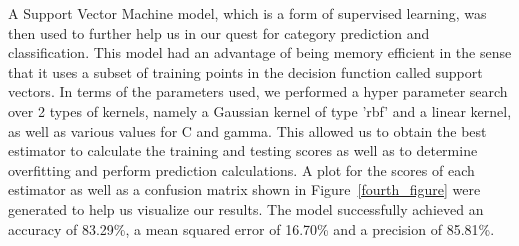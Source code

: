 \documentclass[10pt,twocolumn,letterpaper]{article}
\begin{document}
\begin{figure}[h]
\begin{center}
   \end{center}
        \vspace*{-5mm}
        \caption{\label{third_figure}}
\end{figure}

A Support Vector Machine model, which is a form of supervised learning, was then used to further help us in our quest for category prediction and classification. This model had an advantage of being memory efficient in the sense that it uses a subset of training points in the decision function called support vectors. In terms of the parameters used, we performed a hyper parameter search over 2 types of kernels, namely a Gaussian kernel of type 'rbf' and a linear kernel, as well as various values for C and gamma. This allowed us to obtain the best estimator to calculate the training and testing scores as well as to determine overfitting and perform prediction calculations. A plot for the scores of each estimator as well as a confusion matrix shown in Figure~\ref{fourth_figure} were generated to help us visualize our results. The model successfully achieved an accuracy of 83.29\%, a mean squared error of 16.70\% and a precision of 85.81\%.
\end{document}
